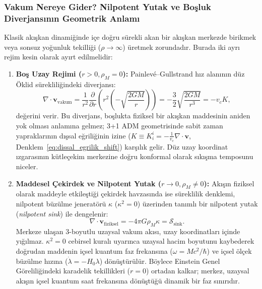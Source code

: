 \subsubsection{Vakum Nereye Gider? Nilpotent Yutak ve Boşluk Diverjansının Geometrik Anlamı}
Klasik akışkan dinamiğinde içe doğru sürekli akan bir akışkan merkezde birikmek veya sonsuz yoğunluk tekilliği ($\rho \to \infty$) üretmek zorundadır. Burada iki ayrı rejim kesin olarak ayırt edilmelidir:
\begin{enumerate}
    \item \textbf{Boş Uzay Rejimi ($r > 0, \rho_M = 0$):} Painlevé--Gullstrand hız alanının düz Öklid sürekliliğindeki diverjansı:
    \begin{equation}
        \nabla \cdot \mathbf{v}_{\mathrm{vakum}} = \frac{1}{r^2} \frac{\partial}{\partial r}\left( r^2 \left(-\sqrt{\frac{2GM}{r}}\right) \right) = -\frac{3}{2} \sqrt{\frac{2GM}{r^3}} = - v_c K,
        \label{eq:extrinsic_curvature_trace}
    \end{equation}
    değerini verir. Bu diverjans, boşlukta fiziksel bir akışkan maddesinin aniden yok olması anlamına gelmez; 3+1 ADM geometrisinde sabit zaman yapraklarının dışsal eğriliğinin izine ($K \equiv K^i_i = -\frac{1}{v_c}\nabla\cdot\mathbf{v}$, Denklem~\ref{eq:dissal_egrilik_shift}) karşılık gelir. Düz uzay koordinat ızgarasının kütleçekim merkezine doğru konformal olarak sıkışma temposunu niceler.
    \item \textbf{Maddesel Çekirdek ve Nilpotent Yutak ($r \to 0, \rho_M \neq 0$):} Akışın fiziksel olarak maddeyle etkileştiği çekirdek havzasında ise süreklilik denklemi, nilpotent büzülme jeneratörü $\kappa$ ($\kappa^2 = 0$) üzerinden tanımlı bir nilpotent yutak (\textit{nilpotent sink}) ile dengelenir:
    \begin{equation}
        \nabla \cdot \mathbf{v}_{\mathrm{fiziksel}} = -4\pi G \rho_M \kappa = \mathcal{S}_{\mathrm{sink}}.
        \label{eq:sureklilik_main}
    \end{equation}
    Merkeze ulaşan 3-boyutlu uzaysal vakum akısı, uzay koordinatları içinde yığılmaz. $\kappa^2 = 0$ cebirsel kuralı uyarınca uzaysal hacim boyutunu kaybederek doğrudan maddenin içsel kuantum faz frekansına ($\omega = M c^2 / \hbar$) ve içsel ölçek büzülme hızına ($\dot{\lambda} = -H_0 \lambda$) dönüştürülür. Böylece Einstein Genel Göreliliğindeki karadelik tekillikleri ($r=0$) ortadan kalkar; merkez, uzaysal akışın içsel kuantum saat frekansına dönüştüğü dinamik bir faz sınırıdır.
\end{enumerate}

